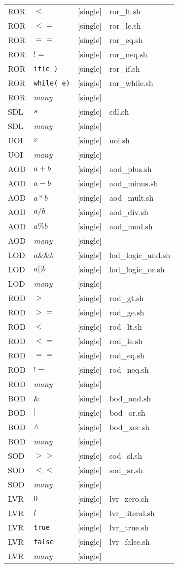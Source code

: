 \begin{table}[h]
\begin{tabular}{|llll|}
ROR	&	$<$	&	[single]	&	ror\_lt.sh \\
ROR	&	$<=$	&	[single]	&	ror\_le.sh \\
ROR	&	$==$	&	[single]	&	ror\_eq.sh \\
ROR	&	$!=$	&	[single]	&	ror\_neq.sh \\
ROR	&	\texttt{if(e )}	&	[single]	&	ror\_if.sh \\
ROR	&	\texttt{while( e)}	&	[single]&	ror\_while.sh \\
ROR	&	\textit{many}&	[single]&	 \\
SDL	&	$s$	&	[single]	&	sdl.sh \\
SDL	&	\textit{many}	&	[single]	&	 \\
UOI	&	$v$	&	[single]	&	uoi.sh \\
UOI	&	\textit{many}	&	[single]	&	 \\
AOD	&	$a + b$	&	[single]	&	aod\_plus.sh \\
AOD	&	$a - b$	&	[single]	&	aod\_minus.sh \\
AOD	&	$a * b$	&	[single]	&	aod\_mult.sh \\
AOD	&	$a / b$	&	[single]	&	aod\_div.sh \\
AOD	&	$a \% b$	&	[single]	&	aod\_mod.sh \\
AOD	&	\textit{many}	&	[single]	&	 \\
LOD	&	$a \&\& b$	&	[single]	&	lod\_logic\_and.sh \\
LOD	&	$a || b$	&	[single]	&	lod\_logic\_or.sh \\
LOD	&	\textit{many}	&	[single]	&	 \\
ROD	&	$>$	&	[single]	&	rod\_gt.sh \\
ROD	&	$>=$	&	[single]	&	rod\_ge.sh \\
ROD	&	$<$	&	[single]	&	rod\_lt.sh \\
ROD	&	$<=$	&	[single]	&	rod\_le.sh \\
ROD	&	$==$	&	[single]	&	rod\_eq.sh \\
ROD	&	$!=$	&	[single]	&	rod\_neq.sh \\
ROD	&	\textit{many}	&	[single]	&	 \\
BOD	&	$\&$	&	[single]	&	bod\_and.sh \\
BOD	&	$|$	&	[single]	&	bod\_or.sh \\
BOD	&	$\land$	&	[single]	&	bod\_xor.sh \\
BOD	&	\textit{many}	&	[single]	&	 \\
SOD	&	$>>$	&	[single]	&	sod\_sl.sh \\
SOD	&	$<<$	&	[single]	&	sod\_sr.sh \\
SOD	&	\textit{many}	&	[single]	&	 \\
LVR	&	$0$	&	[single]	&	lvr\_zero.sh \\
LVR	&	$l$	&	[single]	&	lvr\_literal.sh \\
LVR	&	\texttt{true}	&	[single]	&	lvr\_true.sh \\
LVR	&	\texttt{false}	&	[single]	&	lvr\_false.sh \\
LVR	&	\textit{many}	&	[single]	&	 \\
\hline
\end{tabular}
\end{table}